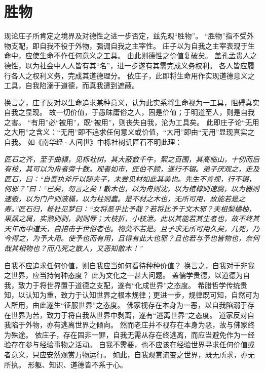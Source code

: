 \documentclass[11pt]{article}
\begin{document}
\section{胜物}
现论庄子所肯定之境界及对德性之进一步否定，兹先观“胜物”。
“胜物”指不受外物支配，即自我不役于外物，强调自我之主宰性。
庄子以为自我之主宰表现于生命中，应使生命不作任何意义之工具。
由此则德性之价值复破矣。
盖孔孟贵人之德性，以为社会中人人皆有其“名”，进一步遂有其需完成义务权利。
各人皆应履行各人之权利义务，完成其道德理分。
依庄子，此即将生命用作实现道德意义之工具，自我陷溺于道德，而真我遭到遮蔽。

\par

换言之，庄子反对以生命追求某种意义，认为此实系将生命视为一工具，阻碍真实自我之显现。
故一切价值，于愚昧庸俗之人，固是价值；于明道至人，则是自我之害。
“有用”必“被用”，既“被用”，则丧失自我，沦为工具矣。
此即庄子论“无用之大用”之含义：“无用”即不追求任何意义或价值，“大用”即由“无用”显现真实之自我。
如《南华经·人间世》中栎社树讥匠石不明此理：

\textit{匠石之齐，至于曲辕，见栎社树。其大蔽数千牛，絜之百围，其高临山，十仞而后有枝，其可以为舟者旁十数。观者如市，匠伯不顾，遂行不辍。弟子厌观之，走及匠石，曰：“自吾执斧斤以随夫子，未尝见材如此其美也。先生不肯视，行不辍，何邪？”曰：“已矣，勿言之矣！散木也，以为舟则沈，以为棺椁则速腐，以为器则速毁，以为门户则液樠，以为柱则蠹。是不材之木也，无所可用，故能若是之寿。”匠石归，栎社见梦曰：“女将恶乎比予哉？若将比予于文木邪？夫柤梨橘柚，果蓏之属，实熟则剥，剥则辱；大枝折，小枝泄。此以其能若其生者也，故不终其天年而中道夭，自掊击于世俗者也。物莫不若是。且予求无所可用久矣，几死，乃今得之，为予大用。使予也而有用，且得有此大也邪？且也若与予也皆物也，奈何哉其相物也？而几死之散人，又恶知散木！”}

\par

自我不应追求任何价值，则自我应当如何看待种种价值？
换言之，自我对于非我之世界，应当持何种态度？
此为文化之一甚大问题。
盖儒学贵德，以道德为自我，致力于将世界置于道德之支配，遂有“化成世界”之态度。
希腊哲学传统贵知，以认知为重，致力于认知世界之根本规律；更进一步，规律既可知，自然可为人所用，由此遂生“征服世界”之态度。
佛家视存在本身为一恶，以自我陷溺于存在世界为苦，致力于将自我从世界中剥离，遂有“逃离世界”之态度。
道家反对自我陷于外物，亦有逃离世界之倾向。
然而老庄并不视存在本身为恶，故与佛家终为殊途。
依庄子，存在固非一罪，自我无需从存在终逃离，而应当避免作为一经验存在参与经验事物之活动。
自我不需要，也不应该在经验世界寻求任何价值或者意义，只应安然观赏万物运行。
如此，自我观赏流变之世界，既无所求，亦无所执。
形躯、知识、道德皆不系于心。
\end{document}
